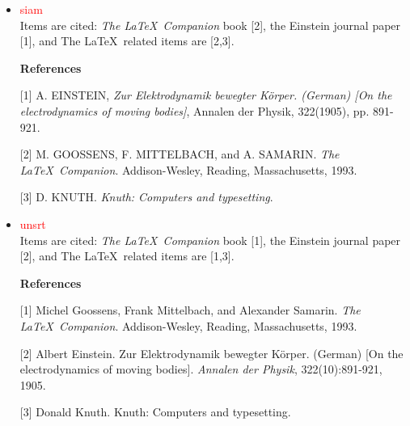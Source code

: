 \begin{itemize}
[1]  Albert Einstein. Zur Elektrodynamik bewegter K\"{o}rper. (German) [On the electrodynamics of moving bodies]. \textit{Annalen der Physik}, 322(10):891-921, 1905.

[2] Michel Goossens, Frank Mittelbach, and Alexander Samarin. \textit{The \LaTeX~Companion}. Addison-Wesley, Reading, Massachusetts, 1993.

[3] Donald Knuth. Knuth: Computers and typesetting.
\item \textcolor{red}{siam}\\
Items are cited: \textit{The \LaTeX~Companion} book [2], the Einstein journal paper [1], and The \LaTeX~related items are [2,3].

\textbf{References} 

[1] A. EINSTEIN, \textit{Zur Elektrodynamik bewegter K\"{o}rper. (German) [On the electrodynamics of moving bodies]}, Annalen der Physik, 322(1905), pp. 891-921.

[2] M. GOOSSENS, F. MITTELBACH, and A. SAMARIN. \textit{The \LaTeX~Companion}. Addison-Wesley, Reading, Massachusetts, 1993.

[3] D. KNUTH. \textit{Knuth: Computers and typesetting}.

\item \textcolor{red}{unsrt} \\
Items are cited: \textit{The \LaTeX~Companion} book [1], the Einstein journal paper [2], and The \LaTeX~related items are [1,3].

\textbf{References}

[1] Michel Goossens, Frank Mittelbach, and Alexander Samarin. \textit{The \LaTeX~Companion}. Addison-Wesley, Reading, Massachusetts, 1993.

[2] Albert Einstein. Zur Elektrodynamik bewegter K\"{o}rper. (German) [On the electrodynamics of moving bodies]. \textit{Annalen der Physik}, 322(10):891-921, 1905.

[3] Donald Knuth. Knuth: Computers and typesetting.
\end{itemize}
